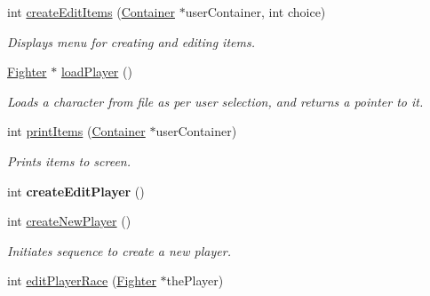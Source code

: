 \begin{DoxyCompactItemize}
\hypertarget{class_game_loops_aee0164d1f1fec6328c07fddaafa2e213}{}\label{class_game_loops_aee0164d1f1fec6328c07fddaafa2e213} 
int \hyperlink{class_game_loops_aee0164d1f1fec6328c07fddaafa2e213}{create\+Edit\+Items} (\hyperlink{class_container}{Container} $\ast$user\+Container, int choice)
\begin{DoxyCompactList}\small\item\em Displays menu for creating and editing items. \end{DoxyCompactList}\item 
\hypertarget{class_game_loops_aab5d14158109b0fb96a313b222dd2985}{}\label{class_game_loops_aab5d14158109b0fb96a313b222dd2985} 
\hyperlink{class_fighter}{Fighter} $\ast$ \hyperlink{class_game_loops_aab5d14158109b0fb96a313b222dd2985}{load\+Player} ()
\begin{DoxyCompactList}\small\item\em Loads a character from file as per user selection, and returns a pointer to it. \end{DoxyCompactList}\item 
\hypertarget{class_game_loops_abf4c74dc17d5581d7f90b6d0eedb32d4}{}\label{class_game_loops_abf4c74dc17d5581d7f90b6d0eedb32d4} 
int \hyperlink{class_game_loops_abf4c74dc17d5581d7f90b6d0eedb32d4}{print\+Items} (\hyperlink{class_container}{Container} $\ast$user\+Container)
\begin{DoxyCompactList}\small\item\em Prints items to screen. \end{DoxyCompactList}\item 
\hypertarget{class_game_loops_a94b59a3e91685adfec0c1963e67b2348}{}\label{class_game_loops_a94b59a3e91685adfec0c1963e67b2348} 
int {\bfseries create\+Edit\+Player} ()
\item 
\hypertarget{class_game_loops_a0d9eb7213d9039a543b41bc624118f97}{}\label{class_game_loops_a0d9eb7213d9039a543b41bc624118f97} 
int \hyperlink{class_game_loops_a0d9eb7213d9039a543b41bc624118f97}{create\+New\+Player} ()
\begin{DoxyCompactList}\small\item\em Initiates sequence to create a new player. \end{DoxyCompactList}\item 
\hypertarget{class_game_loops_a06e6311c1df62d3024eec29eab436a53}{}\label{class_game_loops_a06e6311c1df62d3024eec29eab436a53} 
int \hyperlink{class_game_loops_a06e6311c1df62d3024eec29eab436a53}{edit\+Player\+Race} (\hyperlink{class_fighter}{Fighter} $\ast$the\+Player)

\end{DoxyCompactItemize}
